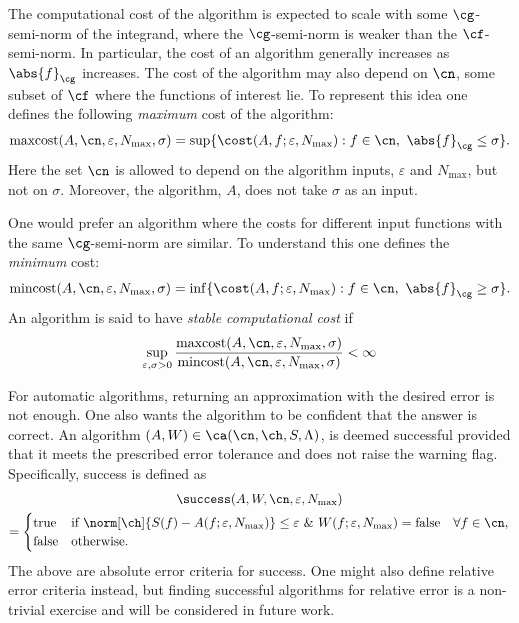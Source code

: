 \documentclass[]{elsarticle}
\DeclareMathOperator{\maxcost}{maxcost}
\DeclareMathOperator{\mincost}{mincost}
\theoremstyle{definition}
\theoremstyle{remark}
\newcommand{\Gnorm}[1]{\abs{#1}_{\cg}}
\begin{document}
The computational cost of the algorithm is expected to scale with some $\cg$-semi-norm of the integrand, where the $\cg$-semi-norm is weaker than the $\cf$-semi-norm.  In particular, the cost of an algorithm generally increases as $\Gnorm{f}$ increases.  The cost of the algorithm may also depend on $\cn$, some subset of $\cf$ where the functions of interest lie.  To represent this idea one defines the following \emph{maximum} cost of the algorithm:
\begin{equation*}
\maxcost(A,\cn,\varepsilon,N_{\max},\sigma)
= \sup \{ \cost(A,f;\varepsilon,N_{\max}) : f \in \cn, \ \Gnorm{f} \le \sigma \} .
\end{equation*}
Here the set $\cn$ is allowed to depend on the algorithm inputs, $\varepsilon$ and $N_{\max}$, but not on $\sigma$.  Moreover, the algorithm, $A$, does not take $\sigma$ as an input.

One would prefer an algorithm where the costs for different input functions with the same $\cg$-semi-norm are similar.  To understand this one defines the  \emph{minimum} cost:
\begin{equation*}
\mincost(A,\cn,\varepsilon,N_{\max},\sigma)
= \inf \{ \cost(A,f;\varepsilon,N_{\max}) : f \in \cn, \ \Gnorm{f} \ge \sigma \} .
\end{equation*}
An algorithm is said to have \emph{stable computational cost} if 
\begin{equation*}
\sup_{\varepsilon, \sigma > 0} \frac{\maxcost(A,\cn,\varepsilon,N_{\max},\sigma)}{\mincost(A,\cn,\varepsilon,N_{\max},\sigma)} < \infty
\end{equation*}

For automatic algorithms, returning an approximation with the desired error is not enough.  One also wants the algorithm to be confident that the answer is correct.  An  algorithm  $(A,W) \in \ca(\cn,\ch,S,\Lambda)$, is deemed successful provided that it meets the prescribed error tolerance and does not raise the warning flag.  Specifically, success is defined as
\begin{multline*}
\success(A,W,\cn,\varepsilon,N_{\max}) \\
= \begin{cases} \text{true} & \text{if } \displaystyle \norm[\ch]{S(f)-A(f;\varepsilon,N_{\max})} \le \varepsilon \ \& \ W(f;\varepsilon,N_{\max})=\text{false} \quad \forall  f \in \cn, \\
\displaystyle \text{false} & \text{otherwise}.
\end{cases}
\end{multline*}
The above are absolute error criteria for success.  One might also define relative error criteria instead, but finding successful algorithms for relative error is a non-trivial exercise and will be considered in future work.
\end{document}
